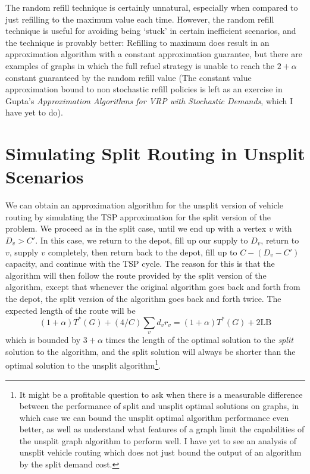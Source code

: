 \documentclass{article}
\theoremstyle{plain}
\theoremstyle{plain}
\begin{document}
The random refill technique is certainly unnatural, especially when compared to just refilling to the maximum value each time. However, the random refill technique is useful for avoiding being `stuck' in certain inefficient scenarios, and the technique is provably better: Refilling to maximum does result in an approximation algorithm with a constant approximation guarantee, but there are examples of graphs in which the full refuel strategy is unable to reach the $2 + \alpha$ constant guaranteed by the random refill value (The constant value approximation bound to non stochastic refill policies is left as an exercise in  Gupta's {\it Approximation Algorithms for VRP with Stochastic Demands}, which I have yet to do).

\section{Simulating Split Routing in Unsplit Scenarios}

We can obtain an approximation algorithm for the unsplit version of vehicle routing by simulating the TSP approximation for the split version of the problem. We proceed as in the split case, until we end up with a vertex $v$ with $D_v > C'$. In this case, we return to the depot, fill up our supply to $D_v$, return to $v$, supply $v$ completely, then return back to the depot, fill up to $C - (D_v - C')$ capacity, and continue with the TSP cycle. The reason for this is that the algorithm will then follow the route provided by the split version of the algorithm, except that whenever the original algorithm goes back and forth from the depot, the split version of the algorithm goes back and forth twice. The expected length of the route will be
%
\[ (1 + \alpha) T^*(G) + (4/C) \sum_v d_v r_v = (1 + \alpha) T^*(G) + 2 \text{LB} \]
%
which is bounded by $3 + \alpha$ times the length of the optimal solution to the {\it split} solution to the algorithm, and the split solution will always be shorter than the optimal solution to the unsplit algorithm\footnote{It might be a profitable question to ask when there is a measurable difference between the performance of split and unsplit optimal solutions on graphs, in which case we can bound the unsplit optimal algorithm performance even better, as well as understand what features of a graph limit the capabilities of the unsplit graph algorithm to perform well. I have yet to see an analysis of unsplit vehicle routing which does not just bound the output of an algorithm by the split demand cost.}.
\end{document}
